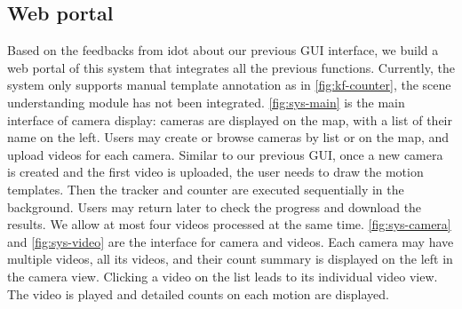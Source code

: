 

\subsection{Web portal}
Based on the feedbacks from \gls{idot} about our previous GUI interface, we build a web portal of this system that integrates all the previous functions.
Currently, the system only supports manual template annotation as in \ref{fig:kf-counter}, the scene understanding module has not been integrated.
\ref{fig:sys-main} is the main interface of camera display: cameras are displayed on the map, with a list of their name on the left. 
Users may create or browse cameras by list or on the map, and upload videos for each camera. 
Similar to our previous GUI, once a new camera is created and the first video is uploaded, the user needs to draw the motion templates.
Then the tracker and counter are executed sequentially in the background. 
Users may return later to check the progress and download the results. We allow at most four videos processed at the same time. 
\ref{fig:sys-camera} and \ref{fig:sys-video} are the interface for camera and videos. 
Each camera may have multiple videos, all its videos, and their count summary is displayed on the left in the camera view. 
Clicking a video on the list leads to its individual video view. The video is played and detailed counts on each motion are displayed.

